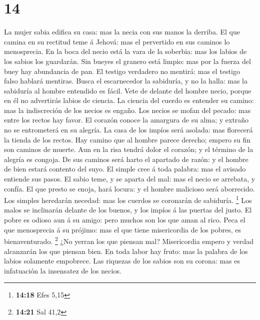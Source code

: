 \hypertarget{section-13}{%
\section{14}\label{section-13}}

 La mujer sabia edifica su casa: mas la necia con sus manos
la derriba.  El que camina en su rectitud teme á Jehová: mas
el pervertido en sus caminos lo menosprecia.  En la boca del
necio está la vara de la soberbia: mas los labios de los sabios los
guardarán.  Sin bueyes el granero está limpio: mas por la
fuerza del buey hay abundancia de pan.  El testigo verdadero
no mentirá: mas el testigo falso hablará mentiras.  Busca el
escarnecedor la sabiduría, y no la halla: mas la sabiduría al hombre
entendido es fácil.  Vete de delante del hombre necio,
porque en él no advertirás labios de ciencia.  La ciencia
del cuerdo es entender su camino: mas la indiscreción de los necios es
engaño.  Los necios se mofan del pecado: mas entre los
rectos hay favor.  El corazón conoce la amargura de su
alma; y extraño no se entrometerá en su alegría.  La casa
de los impíos será asolada: mas florecerá la tienda de los rectos.
 Hay camino que al hombre parece derecho; empero su fin son
caminos de muerte.  Aun en la risa tendrá dolor el corazón;
y el término de la alegría es congoja.  De sus caminos será
harto el apartado de razón: y el hombre de bien estará contento del
suyo.  El simple cree á toda palabra: mas el avisado
entiende sus pasos.  El sabio teme, y se aparta del mal:
mas el necio se arrebata, y confía.  El que presto se
enoja, hará locura: y el hombre malicioso será aborrecido. 
Los simples heredarán necedad: mas los cuerdos se coronarán de
sabiduría. \footnote{\textbf{14:18} Efes 5,15}  Los malos
se inclinarán delante de los buenos, y los impíos á las puertas del
justo.  El pobre es odioso aun á su amigo: pero muchos son
los que aman al rico.  Peca el que menosprecia á su
prójimo: mas el que tiene misericordia de los pobres, es bienaventurado.
\footnote{\textbf{14:21} Sal 41,2}  ¿No yerran los que
piensan mal? Misericordia empero y verdad alcanzarán los que piensan
bien.  En toda labor hay fruto: mas la palabra de los
labios solamente empobrece.  Las riquezas de los sabios son
su corona: mas es infatuación la insensatez de los necios. 
